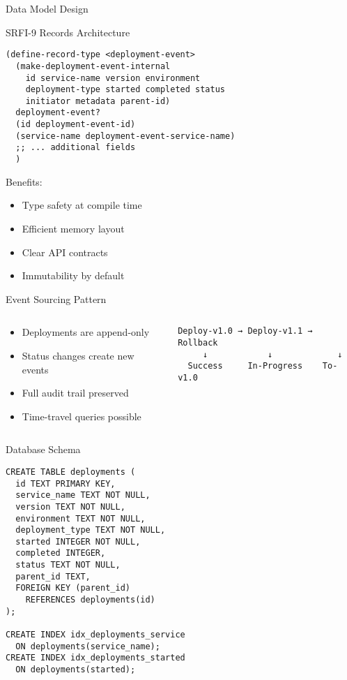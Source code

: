 \documentclass[presentation,aspectratio=169]{beamer}
\begin{document}
\begin{frame}[label={sec:org1e47bf2},fragile]{Data Model Design}
 \begin{block}{SRFI-9 Records Architecture}
\begin{verbatim}
(define-record-type <deployment-event>
  (make-deployment-event-internal
    id service-name version environment
    deployment-type started completed status
    initiator metadata parent-id)
  deployment-event?
  (id deployment-event-id)
  (service-name deployment-event-service-name)
  ;; ... additional fields
  )
\end{verbatim}

Benefits:
\begin{itemize}
\item Type safety at compile time
\item Efficient memory layout
\item Clear API contracts
\item Immutability by default
\end{itemize}
\end{block}
\begin{block}{Event Sourcing Pattern}
\begin{columns}
\begin{column}{0.5\columnwidth}
\begin{itemize}
\item Deployments are append-only
\item Status changes create new events
\item Full audit trail preserved
\item Time-travel queries possible
\end{itemize}
\end{column}
\begin{column}{0.5\columnwidth}
\begin{verbatim}
Deploy-v1.0 → Deploy-v1.1 → Rollback
     ↓            ↓             ↓
  Success     In-Progress    To-v1.0
\end{verbatim}
\end{column}
\end{columns}
\end{block}
\begin{block}{Database Schema}
\begin{verbatim}
CREATE TABLE deployments (
  id TEXT PRIMARY KEY,
  service_name TEXT NOT NULL,
  version TEXT NOT NULL,
  environment TEXT NOT NULL,
  deployment_type TEXT NOT NULL,
  started INTEGER NOT NULL,
  completed INTEGER,
  status TEXT NOT NULL,
  parent_id TEXT,
  FOREIGN KEY (parent_id)
    REFERENCES deployments(id)
);

CREATE INDEX idx_deployments_service
  ON deployments(service_name);
CREATE INDEX idx_deployments_started
  ON deployments(started);
\end{verbatim}
\end{block}
\end{frame}
\end{document}
